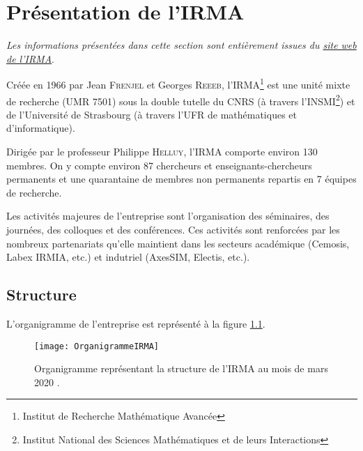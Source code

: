 
\chapter{Présentation de l'IRMA} %

\label{Chapter2} %

\textit{Les informations présentées dans cette section sont entièrement issues du \href{http://irma.math.unistra.fr/}{site web de l'IRMA}}.

Créée en 1966 par Jean \textsc{Frenjel} et Georges \textsc{Reeeb}, l'IRMA\footnote{Institut de Recherche Mathématique Avancée} est une unité mixte de recherche (UMR 7501) sous la double tutelle du CNRS (à travers l'INSMI\footnote{Institut National des Sciences Mathématiques et de leurs Interactions}) et de l’Université de Strasbourg (à travers l'UFR de mathématiques et d’informatique).

Dirigée par le professeur Philippe \textsc{Helluy}, l'IRMA comporte environ 130 membres. On y compte environ 87 chercheurs et enseignants-chercheurs permanents et une quarantaine de membres non permanents repartis en 7 équipes de recherche.

Les activités majeures de l'entreprise sont l'organisation des séminaires, des journées, des colloques et des conférences. Ces activités sont renforcées par les nombreux partenariats qu'elle maintient dans les secteurs académique (Cemosis, Labex IRMIA, etc.) et indutriel (AxesSIM, Electis, etc.).


\section{Structure}
L'organigramme de l'entreprise est représenté à la figure \ref{fig:OrganigrammeIRMA}.

\begin{figure}[!h]
\centering
\texttt{[image: OrganigrammeIRMA]} 
\decoRule
\caption[Organigramme de l'IRMA]{Organigramme représentant la structure de l'IRMA au mois de mars 2020 \parencite{Reference7}.}
\label{fig:OrganigrammeIRMA}
\end{figure}


